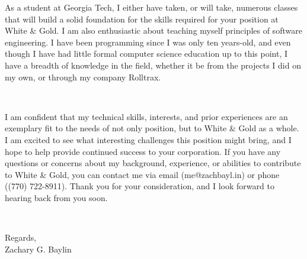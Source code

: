 \documentclass{article}
\begin{document}
  As a student at Georgia Tech, I either have taken, or will take, numerous classes that will build a solid foundation for the skills required for your position at White \& Gold. I am also enthusiastic about teaching myself principles of software engineering. I have been programming since I was only ten years-old, and even though I have had little formal computer science education up to this point, I have a breadth of knowledge in the field, whether it be from the projects I did on my own, or through my company Rolltrax.

  ~

  I am confident that my technical skills, interests, and prior experiences are an exemplary fit to the needs of not only position, but to White \& Gold as a whole. I am excited to see what interesting challenges this position might bring, and I hope to help provide continued success to your corporation. If you have any questions or concerns about my background, experience, or abilities to contribute to White \& Gold, you can contact me via email (me@zachbayl.in) or phone ((770) 722-8911). Thank you for your consideration, and I look forward to hearing back from you soon.

  ~

  \noindent Regards,\\
  Zachary G. Baylin
\end{document}
